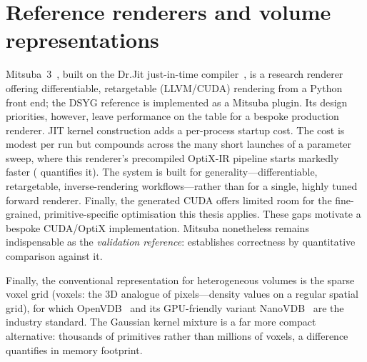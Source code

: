 \section{Reference renderers and volume representations}
\label{sec:reference-renderers}

Mitsuba~3~\cite{Mitsuba3}, built on the Dr.Jit just-in-time compiler~\cite{DrJit}, is a research
renderer offering differentiable, retargetable (LLVM/CUDA) rendering from a Python front end; the
DSYG reference is implemented as a Mitsuba plugin. Its design priorities, however, leave performance
on the table for a bespoke production renderer. JIT kernel construction adds a per-process startup
cost. The cost is modest per run but compounds across the many short launches of a parameter sweep,
where this renderer's precompiled OptiX-IR pipeline starts markedly faster (
quantifies it). The system is built for generality---differentiable, retargetable, inverse-rendering
workflows---rather than for a single, highly tuned forward renderer. Finally, the generated CUDA
offers limited room for the fine-grained, primitive-specific optimisation this thesis applies. These
gaps motivate a bespoke CUDA/OptiX implementation. Mitsuba nonetheless remains
indispensable as the \emph{validation reference}:  establishes correctness by
quantitative comparison against it.

Finally, the conventional representation for heterogeneous volumes is the sparse voxel grid
(voxels: the 3D analogue of pixels---density values on a regular spatial grid), for
which OpenVDB~\cite{OpenVDB} and its GPU-friendly variant NanoVDB~\cite{NanoVDB} are the industry
standard. The Gaussian kernel mixture is a far more compact alternative: thousands of primitives
rather than millions of voxels, a difference  quantifies in memory footprint.
